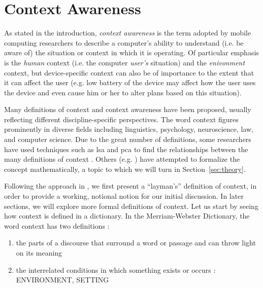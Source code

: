 \chapter{Context Awareness}
\label{ch:context_awareness}

As stated in the introduction, \emph{context awareness} is the term adopted by mobile computing researchers to describe a computer's ability to understand (i.e. be aware of) the situation or context in which it is operating. Of particular emphasis is the \emph{human} context (i.e. the computer \emph{user's} situation) and the \emph{enivonment} context, but device-specific context can also be of importance to the extent that it can affect the user (e.g. low battery of the device may affect how the user uses the device and even cause him or her to alter plans based on this situation).

Many definitions of context and context awareness have been proposed, usually reflecting different discipline-specific perspectives. The word context figures prominently in diverse fields including linguistics, psychology, neuroscience, law, and computer science. Due to the great number of definitions, some researchers have used techniques such as \gls{lsa} and \gls{pca} to find the relationships between the many definitions of context \cite{Foltz1998} \cite{Bazire2005}. Others (e.g. \cite{McCarthy1993}) have attempted to formalize the concept mathematically, a topic to which we will turn in Section~\ref{sec:theory}.

Following the approach in \cite{chen_geospatial_2014}, we first present a ``layman's'' definition of context, in order to provide a working, notional notion for our initial discussion. In later sections, we will explore more formal definitions of context. Let us start by seeing how context is defined in a dictionary. In the Merriam-Webster Dictionary, the word context has two definitions \cite{merriam2015}:

\begin{enumerate}
  \item the parts of a discourse that surround a word or passage and can throw light on its meaning
  \item the interrelated conditions in which something exists or occurs : ENVIRONMENT, SETTING
\end{enumerate}

